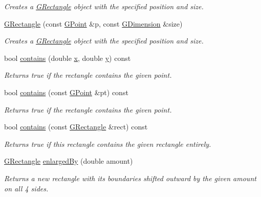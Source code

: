 \begin{DoxyCompactItemize}
\begin{DoxyCompactList}\small\item\em Creates a {\ttfamily \mbox{\hyperlink{structGRectangle}{G\+Rectangle}}} object with the specified position and size. \end{DoxyCompactList}\item 
\mbox{\hyperlink{structGRectangle_a90356cb96943b1a130aa934f150265a7}{G\+Rectangle}} (const \mbox{\hyperlink{structGPoint}{G\+Point}} \&p, const \mbox{\hyperlink{structGDimension}{G\+Dimension}} \&size)
\begin{DoxyCompactList}\small\item\em Creates a {\ttfamily \mbox{\hyperlink{structGRectangle}{G\+Rectangle}}} object with the specified position and size. \end{DoxyCompactList}\item 
bool \mbox{\hyperlink{structGRectangle_abb6a5d7c03e6eaaae97264c4799ce7c3}{contains}} (double \mbox{\hyperlink{structGRectangle_af88b946fb90d5f08b5fb740c70e98c10}{x}}, double \mbox{\hyperlink{structGRectangle_ab927965981178aa1fba979a37168db2a}{y}}) const
\begin{DoxyCompactList}\small\item\em Returns {\ttfamily true} if the rectangle contains the given point. \end{DoxyCompactList}\item 
bool \mbox{\hyperlink{structGRectangle_a1dbc9dafaae51958112dbe1267a1f547}{contains}} (const \mbox{\hyperlink{structGPoint}{G\+Point}} \&pt) const
\begin{DoxyCompactList}\small\item\em Returns {\ttfamily true} if the rectangle contains the given point. \end{DoxyCompactList}\item 
bool \mbox{\hyperlink{structGRectangle_a5e2ef5fc6df7e73cd949c042ba2ffcf7}{contains}} (const \mbox{\hyperlink{structGRectangle}{G\+Rectangle}} \&rect) const
\begin{DoxyCompactList}\small\item\em Returns {\ttfamily true} if this rectangle contains the given rectangle entirely. \end{DoxyCompactList}\item 
\mbox{\hyperlink{structGRectangle}{G\+Rectangle}} \mbox{\hyperlink{structGRectangle_adddb08ead701a5144949ca673a44292c}{enlarged\+By}} (double amount)
\begin{DoxyCompactList}\small\item\em Returns a new rectangle with its boundaries shifted outward by the given amount on all 4 sides. \end{DoxyCompactList}\item 

\end{DoxyCompactItemize}
